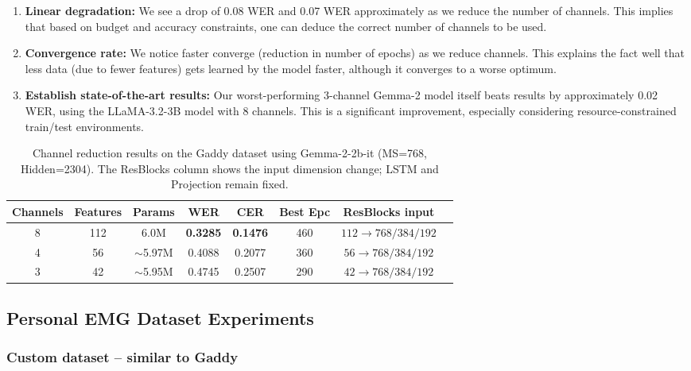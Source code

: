 \begin{enumerate}
    \item \textbf{Linear degradation:} We see a drop of 0.08 WER and 0.07 WER approximately as we reduce the number of channels. This implies that based on budget and accuracy constraints, one can deduce the correct number of channels to be used.

    \item \textbf{Convergence rate:} We notice faster converge (reduction in number of epochs) as we reduce channels. This explains the fact well that less data (due to fewer features) gets learned by the model faster, although it converges to a worse optimum.

    \item \textbf{Establish state-of-the-art results:} Our worst-performing 3-channel Gemma-2 model itself beats \citet{mohapatra2025} results by approximately 0.02 WER, using the LLaMA-3.2-3B model with 8 channels. This is a significant improvement, especially considering resource-constrained train/test environments.
\end{enumerate}

\begin{table}[ht]
\centering
\caption{Channel reduction results on the Gaddy dataset using Gemma-2-2b-it (MS=768, Hidden=2304). The ResBlocks column shows the input dimension change; LSTM and Projection remain fixed.}
\label{tab:channel_results}
\begin{tabular}{cccccccc}
\toprule
\textbf{Channels} & \textbf{Features} & \textbf{Params} & \textbf{WER} & \textbf{CER} & \textbf{Best Epc} & \textbf{ResBlocks input} \\
\midrule
\rowcolor{gray!12} 8 & 112 & 6.0M & \textbf{0.3285} & \textbf{0.1476} & 460 & $112 \to 768/384/192$ \\
4 & 56 & $\sim$5.97M & 0.4088 & 0.2077 & 360 & $56 \to 768/384/192$ \\
3 & 42 & $\sim$5.95M & 0.4745 & 0.2507 & 290 & $42 \to 768/384/192$ \\
\bottomrule
\end{tabular}
\end{table}

\subsection{Personal EMG Dataset Experiments}

\subsubsection{Custom dataset -- similar to Gaddy}

